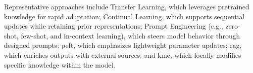 \documentclass[a4paper,fleqn]{cas-sc}
\begin{document}
Representative approaches include Transfer Learning, which leverages pretrained knowledge for rapid adaptation; Continual Learning, which supports sequential updates while retaining prior representations; Prompt Engineering (e.g., zero-shot, few-shot, and in-context learning), which steers model behavior through designed prompts; \gls{peft}, which emphasizes lightweight parameter updates; \gls{rag}, which enriches outputs with external sources;
 and \gls{kme}, which locally modifies specific knowledge within the model.
\end{document}
